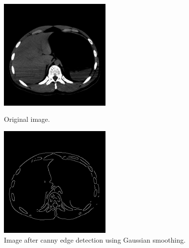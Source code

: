 \documentclass[a4paper,11pt]{article}
\begin{document}
\noindent
\begin{figure}[ht!]
    \begin{minipage}{0.5\textwidth}
        \centering
        \includegraphics[width=55mm]{0005.png}
        \caption{Original image.}
    \end{minipage}\hfill
    \begin{minipage}{0.5\textwidth}
        \centering
        \includegraphics[width=55mm]{0005_canny.png}
        \caption{Image after canny edge detection using Gaussian smoothing.}
    \end{minipage}\hfill
\end{figure}
\end{document}
